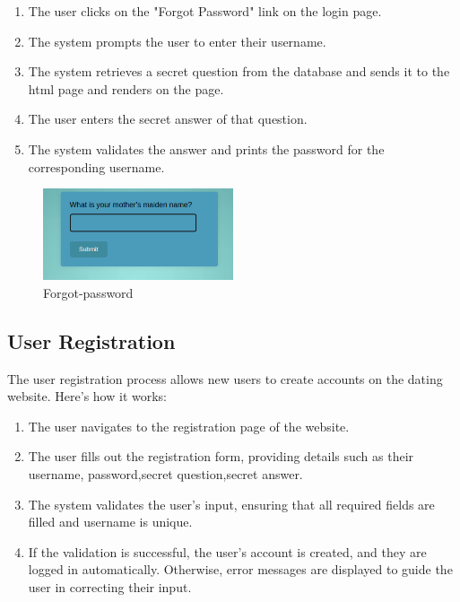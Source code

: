 \documentclass{article}
\begin{document}
\begin{enumerate}
    \item The user clicks on the "Forgot Password" link on the login page.
    \item The system prompts the user to enter their username.
    \item The system retrieves a secret question from the database and sends it to the html page and renders on the page.
    \item The user enters the secret answer of that question.
    \item The system validates the answer and prints the password for the corresponding username.
\end{enumerate}
\begin{figure}[htbp] 
    \centering 
    \includegraphics[width=0.5\textwidth]{forgot.png} 
    \caption{Forgot-password} 
    \label{forgot-password} 
    \end{figure}

\subsection{User Registration}

The user registration process allows new users to create accounts on the dating website. Here's how it works:

\begin{enumerate}
    \item The user navigates to the registration page of the website.
    \item The user fills out the registration form, providing details such as their username, password,secret question,secret answer.
    \item The system validates the user's input, ensuring that all required fields are filled and username is unique.
    \item If the validation is successful, the user's account is created, and they are logged in automatically. Otherwise, error messages are displayed to guide the user in correcting their input.
\end{enumerate}
\end{document}
